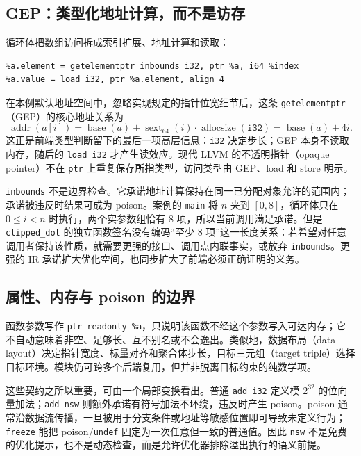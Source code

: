 \subsection{GEP：类型化地址计算，而不是访存}

循环体把数组访问拆成索引扩展、地址计算和读取：
\begin{lstlisting}[language=LLVMIR,basicstyle=\ttfamily\scriptsize]
%index = sext i32 %i to i64
%a.element = getelementptr inbounds i32, ptr %a, i64 %index
%a.value = load i32, ptr %a.element, align 4
\end{lstlisting}
在本例默认地址空间中，忽略实现规定的指针位宽细节后，这条 \texttt{getelementptr}（GEP）的核心地址关系为
\begin{equation}
  \operatorname{addr}(a[i])
  =\operatorname{base}(a)
   +\operatorname{sext}_{64}(i)\cdot\operatorname{allocsize}(\mathtt{i32})
  =\operatorname{base}(a)+4i .
  \label{eq:gep-address}
\end{equation}
这正是前端类型判断留下的最后一项高层信息：\texttt{i32} 决定步长；GEP 本身不读取内存，随后的 \texttt{load i32} 才产生读效应。现代 LLVM 的不透明指针（opaque pointer）不在 \texttt{ptr} 上重复保存所指类型，访问类型由 GEP、load 和 store 明示\cite{llvm-opaque-pointers,llvm-gep}。

\texttt{inbounds} 不是边界检查。它承诺地址计算保持在同一已分配对象允许的范围内；承诺被违反时结果可成为 poison。案例的 \texttt{main} 将 \(n\) 夹到 \([0,8]\)，循环体只在 \(0\le i<n\) 时执行，两个实参数组恰有 8 项，所以当前调用满足承诺。但是 \texttt{clipped\_dot} 的独立函数签名没有编码“至少 8 项”这一长度关系：若希望对任意调用者保持该性质，就需要更强的接口、调用点内联事实，或放弃 \texttt{inbounds}。更强的 IR 承诺扩大优化空间，也同步扩大了前端必须正确证明的义务。

\subsection{属性、内存与 poison 的边界}

函数参数写作 \texttt{ptr readonly \%a}，只说明该函数不经这个参数写入可达内存；它不自动意味着非空、足够长、互不别名或不会逸出。类似地，数据布局（data layout）决定指针宽度、标量对齐和聚合体步长，目标三元组（target triple）选择目标环境。模块仍可跨多个后端复用，但并非脱离目标约束的纯数学项\cite{llvm-datalayout}。

这些契约之所以重要，可由一个局部变换看出。普通 \texttt{add i32} 定义模 \(2^{32}\) 的位向量加法；\texttt{add nsw} 则额外承诺有符号加法不环绕，违反时产生 poison。poison 通常沿数据流传播，一旦被用于分支条件或地址等敏感位置即可导致未定义行为；\texttt{freeze} 能把 poison/\texttt{undef} 固定为一次任意但一致的普通值\cite{llvm-langref}。因此 \texttt{nsw} 不是免费的优化提示，也不是动态检查，而是允许优化器排除溢出执行的语义前提。

